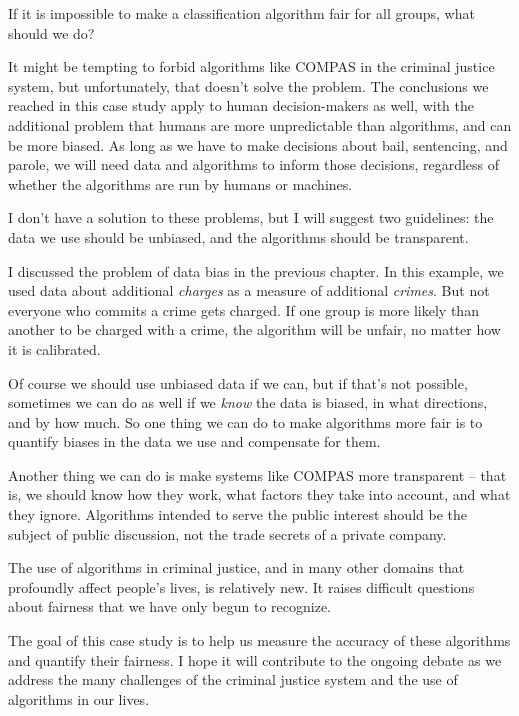 If it is impossible to make a classification algorithm fair for all
groups, what should we do?

It might be tempting to forbid algorithms like COMPAS in the criminal
justice system, but unfortunately, that doesn't solve the problem. The
conclusions we reached in this case study apply to human decision-makers
as well, with the additional problem that humans are more unpredictable
than algorithms, and can be more biased. As long as we have to make
decisions about bail, sentencing, and parole, we will need data and
algorithms to inform those decisions, regardless of whether the
algorithms are run by humans or machines.

I don't have a solution to these problems, but I will suggest two
guidelines: the data we use should be unbiased, and the algorithms
should be transparent.

I discussed the problem of data bias in the previous chapter. In this
example, we used data about additional \emph{charges} as a measure of
additional \emph{crimes}. But not everyone who commits a crime gets
charged. If one group is more likely than another to be charged with a
crime, the algorithm will be unfair, no matter how it is calibrated.

Of course we should use unbiased data if we can, but if that's not
possible, sometimes we can do as well if we \emph{know} the data is
biased, in what directions, and by how much. So one thing we can do to
make algorithms more fair is to quantify biases in the data we use and
compensate for them.

Another thing we can do is make systems like COMPAS more transparent --
that is, we should know how they work, what factors they take into
account, and what they ignore. Algorithms intended to serve the public
interest should be the subject of public discussion, not the trade
secrets of a private company.

The use of algorithms in criminal justice, and in many other domains
that profoundly affect people's lives, is relatively new. It raises
difficult questions about fairness that we have only begun to recognize.

The goal of this case study is to help us measure the accuracy of these
algorithms and quantify their fairness. I hope it will contribute to the
ongoing debate as we address the many challenges of the criminal justice
system and the use of algorithms in our lives.

